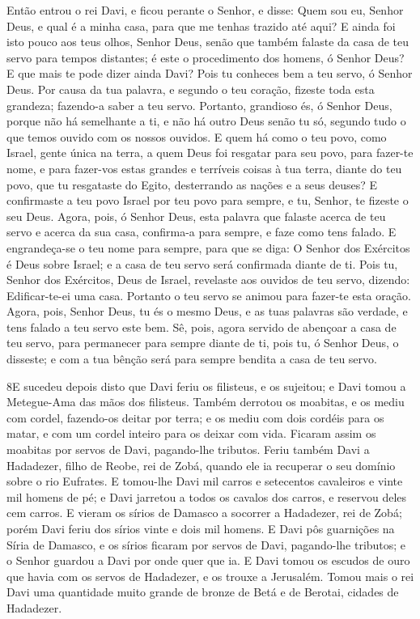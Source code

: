 Então entrou o rei Davi, e ficou perante o Senhor, e disse: Quem
sou eu, Senhor Deus, e qual é a minha casa, para que me tenhas
trazido até aqui? E ainda foi isto pouco aos teus olhos,
Senhor Deus, senão que também falaste da casa de teu servo para
tempos distantes; é este o procedimento dos homens, ó Senhor Deus?
E que mais te pode dizer ainda Davi? Pois tu conheces bem a
teu servo, ó Senhor Deus. Por causa da tua palavra, e segundo
o teu coração, fizeste toda esta grandeza; fazendo-a saber a teu
servo. Portanto, grandioso és, ó Senhor Deus, porque não há
semelhante a ti, e não há outro Deus senão tu só, segundo tudo o que
temos ouvido com os nossos ouvidos. E quem há como o teu
povo, como Israel, gente única na terra, a quem Deus foi resgatar
para seu povo, para fazer-te nome, e para fazer-vos estas grandes e
terríveis coisas à tua terra, diante do teu povo, que tu resgataste
do Egito, desterrando as nações e a seus deuses? E
confirmaste a teu povo Israel por teu povo para sempre, e tu,
Senhor, te fizeste o seu Deus. Agora, pois, ó Senhor Deus,
esta palavra que falaste acerca de teu servo e acerca da sua casa,
confirma-a para sempre, e faze como tens falado. E
engrandeça-se o teu nome para sempre, para que se diga: O Senhor dos
Exércitos é Deus sobre Israel; e a casa de teu servo será confirmada
diante de ti. Pois tu, Senhor dos Exércitos, Deus de Israel,
revelaste aos ouvidos de teu servo, dizendo: Edificar-te-ei uma
casa. Portanto o teu servo se animou para fazer-te esta oração.
Agora, pois, Senhor Deus, tu és o mesmo Deus, e as tuas
palavras são verdade, e tens falado a teu servo este bem. Sê,
pois, agora servido de abençoar a casa de teu servo, para permanecer
para sempre diante de ti, pois tu, ó Senhor Deus, o disseste; e com
a tua bênção será para sempre bendita a casa de teu servo.

\medskip

\lettrine{8} E sucedeu depois disto que Davi feriu os
filisteus, e os sujeitou; e Davi tomou a Metegue-Ama das mãos dos
filisteus. Também derrotou os moabitas, e os mediu com cordel,
fazendo-os deitar por terra; e os mediu com dois cordéis para os
matar, e com um cordel inteiro para os deixar com vida. Ficaram
assim os moabitas por servos de Davi, pagando-lhe tributos.
Feriu também Davi a Hadadezer, filho de Reobe, rei de Zobá,
quando ele ia recuperar o seu domínio sobre o rio Eufrates. E
tomou-lhe Davi mil carros e setecentos cavaleiros e vinte mil homens
de pé; e Davi jarretou a todos os cavalos dos carros, e reservou
deles cem carros. E vieram os sírios de Damasco a socorrer a
Hadadezer, rei de Zobá; porém Davi feriu dos sírios vinte e dois mil
homens. E Davi pôs guarnições na Síria de Damasco, e os sírios
ficaram por servos de Davi, pagando-lhe tributos; e o Senhor guardou
a Davi por onde quer que ia. E Davi tomou os escudos de ouro que
havia com os servos de Hadadezer, e os trouxe a Jerusalém. Tomou
mais o rei Davi uma quantidade muito grande de bronze de Betá e de
Berotai, cidades de Hadadezer.

